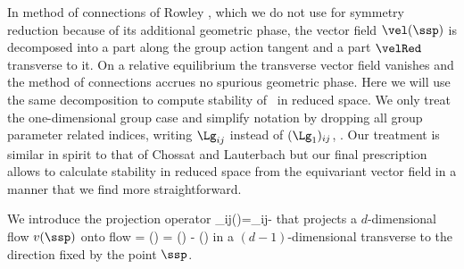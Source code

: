 


In method of connections of Rowley \etal{}, 
which we do not use for symmetry reduction because of
its additional geometric phase, the vector field $\vel(\ssp)$ 
is decomposed into a part along the group action tangent and a part $\velRed$ 
transverse to it. On a relative equilibrium the transverse
vector field vanishes and the method of connections
accrues no spurious geometric phase. Here we will use the same
decomposition to compute stability of \reqva\ in reduced space.
We only treat the one-dimensional group case and simplify
notation by dropping all group parameter related indices, 
writing $\Lg_{ij}$ instead of $(\Lg_1)_{ij}$, \etc. 
Our treatment is similar in spirit to that
of Chossat and Lauterbach but our final
prescription allows to calculate stability in reduced space
from the equi\-vari\-ant vector field in a manner that
we find more straightforward.


We introduce the projection operator
\beq
 	\PperpOp_{ij}(\ssp)=\delta_{ij}-
that projects a $d$-dimensional flow $v(\ssp)$ onto
flow
\beq
	\dot{\sspRed} = \velRed(\ssp) = \vel(\ssp)
    - \groupTan(\ssp) 
in a $(d\!-\!1)$-dimensional {\slice} transverse to the
direction fixed by the point $\ssp$.

